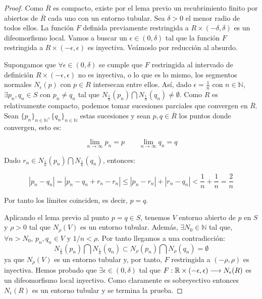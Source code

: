 \begin{proof}
Como $\overline{R}$ es compacto, existe por el lema previo un recubrimiento finito por abiertos de $\overline{R}$ cada uno con un entorno tubular. Sea $\delta > 0$ el menor radio de todos ellos. La función $F$ definida previamente restringida a $R \times (-\delta, \delta)$ es un difeomorfismo local. Vamos a buscar un $\epsilon \in (0,\delta)$ tal que la función $F$ restringida a $R \times (-\epsilon, \epsilon)$ es inyectiva. Veámoslo por reducción al absurdo.

Supongamos que $\forall \epsilon \in (0,\delta)$ se cumple que $F$ restringida al intervado de definición $R \times (-\epsilon, \epsilon)$ no es inyectiva, o lo que es lo mismo, los segmentos normales $N_\epsilon(p)$ con $p \in R$ intersecan entre ellos. Así, dado $\epsilon=\frac{1}{n}$ con $n \in \mathbb{N}$, $\exists p_n,q_n \in S$ con $p_n \neq q_n$ tal que $N_{\frac{1}{n}}(p_n) \bigcap N_{\frac{1}{n}}(q_n) \neq \emptyset$.
Como $R$ es relativamente compacto, podemos tomar sucesiones parciales que convergen en $\overline{R}$. Sean $\{p_n\}_{n \in \mathbb{N}}, \{q_n\}_{n \in \mathbb{N}}$ estas sucesiones y sean $p,q \in \overline{R}$ los puntos donde convergen, esto es:

\begin{equation*}
    \lim_{n\to\infty} p_n = p \qquad \lim_{n\to\infty} q_n = q
\end{equation*}

Dado $r_n \in N_{\frac{1}{n}}(p_n) \bigcap N_{\frac{1}{n}}(q_n)$, entonces:

\begin{equation*}
    |p_n - q_n| = |p_n - q_n + r_n - r_n| \leq |p_n-r_n| + |r_n-q_n| < \frac{1}{n}+\frac{1}{n} = \frac{2}{n}
\end{equation*}

Por tanto los límites coinciden, es decir, $p=q$.

Aplicando el lema previo al punto $p = q \in S$, tenemos $V$ entorno abierto de $p$ en $S$ y $\rho > 0$ tal que $N_\rho(V)$ es un entorno tubular. Además, $\exists N_0 \in \mathbb{N}$ tal que, $\forall n > N_0$, $p_n,q_n \in V$ y $1/n < \rho$. Por tanto llegamos a una contradicción:
%
\begin{equation*}
    N_{\frac{1}{n}}(p_n) \bigcap N_{\frac{1}{n}}(q_n) \subset N_\rho(p_n)\bigcap N_\rho(q_n) = \emptyset
\end{equation*}
%
ya que $N_\rho(V)$ es un entorno tubular y, por tanto, $F$ restringida a $(-\rho, \rho)$ es inyectiva. Hemos probado que $\exists \epsilon \in (0, \delta)$ tal que $F: \mathbb{R} \times (-\epsilon, \epsilon) \longrightarrow N_\epsilon(R)$ es un difeomorfismo local inyectivo. Como claramente es sobreyectivo entonces $N_\epsilon(R)$ es un entorno tubular y se termina la prueba.

\end{proof}

